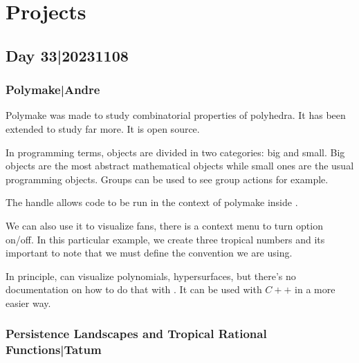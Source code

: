 \documentclass[12pt]{memoir}
\begin{document}
\chapter{Projects}

\section{Day 33|20231108}

\subsection{Polymake|Andre}

Polymake was made to study combinatorial properties of polyhedra. It has been extended to study far more. It is open source.\par 
In programming terms, objects are divided in two categories: big and small. Big objects are the most abstract mathematical objects while small ones are the usual programming objects. Groups can be used to see group actions for example.

\begin{Ex}
    The handle  allows code to be run in the context of polymake inside .\par 
    We can also use it to visualize fans, there is a context menu to turn option on/off. In this particular example, we create three tropical numbers and its important to note that we must define the convention we are using.
\end{Ex}

In principle,  can visualize polynomials, hypersurfaces, but there's no documentation on how to do that with . It can be used with $C++$ in a more easier way.

\subsection{Persistence Landscapes and Tropical Rational Functions|Tatum}
\end{document}
